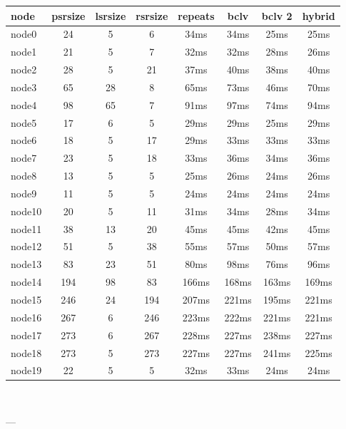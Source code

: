 

\begin{tabular}{|l|c|c|c|c|c|c|c|}
\hline node & psrsize & lsrsize & rsrsize   & repeats & bclv & bclv 2 & hybrid\\
    \hline node0 & 24 & 5 & 6 & 34ms & 34ms & 25ms & 25ms\\
    \hline node1 & 21 & 5 & 7 & 32ms & 32ms & 28ms & 26ms\\
    \hline node2 & 28 & 5 & 21 & 37ms & 40ms & 38ms & 40ms\\
    \hline node3 & 65 & 28 & 8 & 65ms & 73ms & 46ms & 70ms\\
    \hline node4 & 98 & 65 & 7 & 91ms & 97ms & 74ms & 94ms\\
    \hline node5 & 17 & 6 & 5 & 29ms & 29ms & 25ms & 29ms\\
    \hline node6 & 18 & 5 & 17 & 29ms & 33ms & 33ms & 33ms\\
    \hline node7 & 23 & 5 & 18 & 33ms & 36ms & 34ms & 36ms\\
    \hline node8 & 13 & 5 & 5 & 25ms & 26ms & 24ms & 26ms\\
    \hline node9 & 11 & 5 & 5 & 24ms & 24ms & 24ms & 24ms\\
    \hline node10 & 20 & 5 & 11 & 31ms & 34ms & 28ms & 34ms\\
    \hline node11 & 38 & 13 & 20 & 45ms & 45ms & 42ms & 45ms\\
    \hline node12 & 51 & 5 & 38 & 55ms & 57ms & 50ms & 57ms\\
    \hline node13 & 83 & 23 & 51 & 80ms & 98ms & 76ms & 96ms\\
    \hline node14 & 194 & 98 & 83 & 166ms & 168ms & 163ms & 169ms\\
    \hline node15 & 246 & 24 & 194 & 207ms & 221ms & 195ms & 221ms\\
    \hline node16 & 267 & 6 & 246 & 223ms & 222ms & 221ms & 221ms\\
    \hline node17 & 273 & 6 & 267 & 228ms & 227ms & 238ms & 227ms\\
    \hline node18 & 273 & 5 & 273 & 227ms & 227ms & 241ms & 225ms\\
    \hline node19 & 22 & 5 & 5 & 32ms & 33ms & 24ms & 24ms\\

\hline
\end{tabular} \

---


